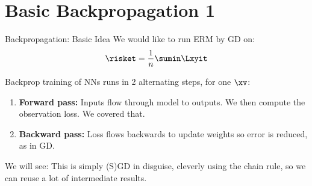 



\section{Basic Backpropagation 1}

\begin{frame}{Backpropagation: Basic Idea}
We would like to run ERM by GD on: $$ \risket = \frac{1}{n} \sumin \Lxyit$$ 

Backprop training of NNs runs in 2 alternating steps, for one $\xv$:
\begin{enumerate}
\item \textbf{Forward pass:} Inputs flow through model to outputs. 
    We then compute the observation loss. We covered that.
\item \textbf{Backward pass:} Loss flows backwards to update weights so error is reduced,
    as in GD.
\end{enumerate}
\lz
We will see: This is simply (S)GD in disguise, cleverly using the chain rule, so we can reuse
a lot of intermediate results.
\end{frame}


